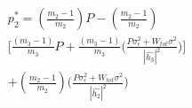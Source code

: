 \documentclass[preview]{standalone}
\begin{document}
\begin{align*}
p_2^\ast = \left(\frac{m_2 - 1}{m_2}\right) P - \left(\frac{m_2 - 1}{m_2}\right) \\ \Bigg[ \frac{\left(m_3 - 1\right)}{m_3} P + \frac{\left(m_3 - 1\right)}{m_3} \Bigg( \frac{P \sigma_\epsilon^2 + W_{tot} \sigma^2 }{ \left| \hat{h_3} \right| ^2 } \Bigg) \Bigg] \\ + \left(\frac{m_2 - 1}{m_2}\right) \Bigg( \frac{P \sigma_\epsilon^2 + W_{tot} \sigma^2}{\left|\hat{h_2}\right|^2} \Bigg)
\end{align*}
\end{document}
